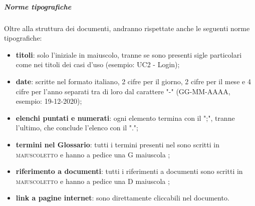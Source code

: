 		\subparagraph{Norme tipografiche}
		Oltre alla struttura dei documenti, andranno rispettate anche le seguenti norme tipografiche:
		\begin{itemize}
			\item \textbf{titoli}: solo l'iniziale in maiuscolo, tranne se sono presenti sigle particolari come nei titoli dei casi d'uso (esempio: UC2 - Login);
			\item \textbf{date}: scritte nel formato italiano, 2 cifre per il giorno, 2 cifre per il mese e 4 cifre per l'anno separati tra di loro dal carattere "-" (GG-MM-AAAA, esempio: 19-12-2020);
			\item \textbf{elenchi puntati e numerati}: ogni elemento termina con il ";", tranne l'ultimo, che conclude l'elenco con il ".";
			\item \textbf{termini nel Glossario}: tutti i termini presenti nel  sono scritti in \textsc{maiuscoletto} e hanno a pedice una G maiuscola \glock{};
			\item \textbf{riferimento a documenti}: tutti i riferimenti a documenti sono scritti in \textsc{maiuscoletto} e hanno a pedice una D maiuscola \dext{};
			\item \textbf{link a pagine internet}: sono direttamente cliccabili nel documento.
		\end{itemize}

